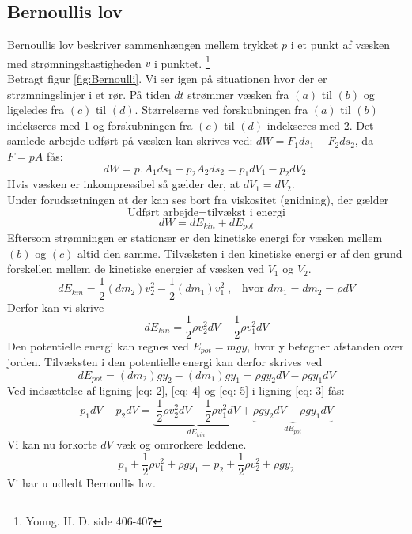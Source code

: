 \documentclass[a4paper, 11pt]{article}
\begin{document}
\subsection{Bernoullis lov}
Bernoullis lov beskriver sammenhængen mellem trykket \(p\) i et punkt af væsken med strømningshastigheden \(v\) i punktet. \footnote{Young. H. D. side 406-407}
\\
Betragt figur \ref{fig:Bernoulli}. Vi ser igen på situationen hvor der er strømningslinjer i et rør. På tiden \(dt\) strømmer væsken fra \((a)\) til \((b)\) 
og ligeledes fra \((c)\) til \((d)\). Størrelserne ved forskubningen fra \((a)\) til \((b)\) indekseres med 1 og  forskubningen fra \((c)\) til \((d)\) indekseres med 2.
Det samlede arbejde udført på væsken kan skrives ved: \(dW=F_1ds_1-F_2ds_2\), da \(F=pA\) fås:
\begin{equation}
    \label{eq: 2}
    dW=p_1A_1ds_1-p_2A_2ds_2=p_1dV_1-p_2dV_2.
\end{equation}
Hvis væsken er inkompressibel så gælder der, at \(dV_1=dV_2\).\\
Under forudsætningen at der kan ses bort fra viskositet (gnidning), der gælder
\[\text{Udført arbejde} = \text{tilvækst i energi}\]
\begin{equation}
    \label{eq: 3}
    dW=dE_{kin}+dE_{pot}
\end{equation}
Eftersom strømningen er stationær er den kinetiske energi for væsken mellem \((b)\) og \((c)\) altid den samme.
Tilvæksten i den kinetiske energi er af den grund forskellen mellem de kinetiske energier af væsken ved \(V_1\) og \(V_2\).
\[dE_{kin}=\frac{1}{2}(dm_2)v_2^2-\frac{1}{2}(dm_1)v_1^2\;,\;\;\; \text{hvor } dm_1=dm_2=\rho dV\]
Derfor kan vi skrive
\begin{equation}
    \label{eq: 4}
    dE_{kin}=\frac{1}{2}\rho v_2^2 dV-\frac{1}{2}\rho v_1^2 dV
\end{equation}
Den potentielle energi kan regnes ved \(E_{pot}=mgy\), hvor y betegner afstanden over jorden. Tilvæksten i den potentielle energi kan derfor skrives ved
\begin{equation}
    \label{eq: 5}
    dE_{pot}=(dm_2)gy_2-(dm_1)gy_1 = \rho g y_2 dV-\rho g y_1 dV
\end{equation}
Ved indsættelse af ligning \ref{eq: 2}, \ref{eq: 4} og \ref{eq: 5} i ligning \ref{eq: 3} fås:
\[p_1dV-p_2dV=\underbrace{\;\frac{1}{2}\rho v_2^2dV - \frac{1}{2} \rho v_1^2dV}_{dE_{kin}} + \underbrace{\rho g y_2 dV - \rho g y_1 dV}_{dE_{pot}}\]
Vi kan nu forkorte \(dV\) væk og omrorkere leddene.
\begin{equation}
    \label{eq: Bernoullis}
    p_1+\frac{1}{2} \rho v_1^2+\rho g y_1 = p_2+\frac{1}{2} \rho v_2^2+\rho gy_2
\end{equation}
Vi har u udledt Bernoullis lov.
\end{document}
